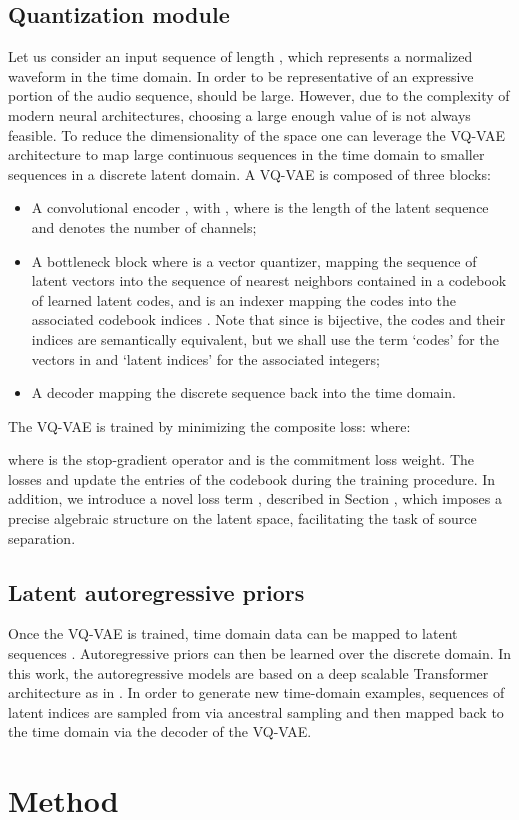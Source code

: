 \documentclass[a4paper]{article}
\begin{document}
\subsection{Quantization module}
Let us consider an input sequence   of length , which represents a normalized waveform in the time domain. In order to be representative of an expressive portion of the audio sequence,  should be large. However, due to the complexity of modern neural architectures, choosing a large enough value of  is not always feasible. To reduce the dimensionality of the space one can leverage the VQ-VAE architecture \cite{oord2017} to map large continuous sequences in the time domain to smaller sequences in a discrete latent domain. A VQ-VAE is composed of three blocks: 
\begin{itemize}
    \item A convolutional encoder , with , where  is the  length of the latent sequence and  denotes the number of channels;
    \item A bottleneck block  where   is a vector quantizer, mapping the sequence of latent vectors  into the sequence of nearest neighbors contained in a codebook  of learned latent codes, and  is an indexer mapping the codes  into the associated codebook indices . Note that since  is bijective, the codes  and their indices  are semantically equivalent, but we shall use the term `codes' for the vectors in  and `latent indices' for the associated integers;
    \item A decoder  mapping the discrete sequence back into the time domain.
\end{itemize}
The VQ-VAE is trained by minimizing the composite loss:
 where:

where  is the stop-gradient operator and  is the commitment loss weight. The losses  and  update the entries of the codebook  during the training procedure. In addition, we introduce a novel loss term , described in Section , which imposes a precise algebraic structure on the latent space, facilitating the task of source separation.

\subsection{Latent autoregressive priors}
Once the VQ-VAE is trained, time domain data  can be mapped to latent sequences . Autoregressive priors  can then be learned over the discrete domain.
In this work, the autoregressive models are based on a deep scalable Transformer architecture as in \cite{dhariwal:2020}.
In order to generate new time-domain examples, sequences of latent indices are sampled from  via ancestral sampling and then mapped back to the time domain via the decoder of the VQ-VAE.  \section{Method}
\label{sec:method}
\end{document}
